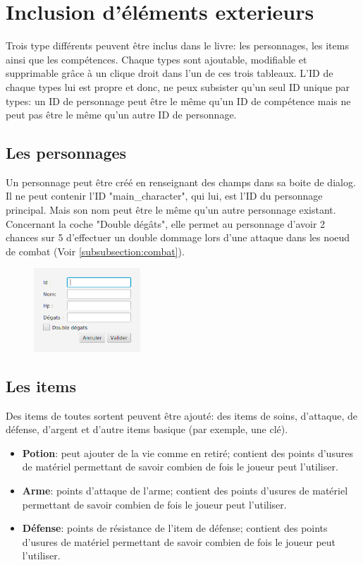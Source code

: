 \chapter{Inclusion d'éléments exterieurs}\label{chapter:inclus}
	Trois type différents peuvent être inclus dans le livre: les personnages, les items ainsi que les compétences. Chaque types sont ajoutable, modifiable et supprimable grâce à un clique droit dans l'un de ces trois tableaux.
	L'ID de chaque types lui est propre et donc, ne peux subsister qu'un seul ID unique par types: un ID de personnage peut être le même qu'un ID de compétence mais ne peut pas être le même qu'un autre ID de personnage.

	\section{Les personnages}
		Un personnage peut être créé en renseignant des champs dans sa boite de dialog. Il ne peut contenir l'ID "main\_character", qui lui, est l'ID du personnage principal. Mais son nom peut être le même qu'un autre personnage existant.
		Concernant la coche "Double dégâts", elle permet au personnage d'avoir 2 chances sur 5 d'effectuer un double dommage lors d'une attaque dans les noeud de combat (Voir \ref{subsubsection:combat}).
	\begin{figure}[H]
		\centering\includegraphics[width=4cm]{img/inclusPersonnages.png}
	\end{figure}

	\section{Les items}
		Des items de toutes sortent peuvent être ajouté: des items de soins, d'attaque, de défense, d'argent et d'autre items basique (par exemple, une clé).
		\begin{itemize}
			\item \textbf{Potion}: peut ajouter de la vie comme en retiré; contient des points d'usures de matériel permettant de savoir combien de fois le joueur peut l'utiliser.
			\item \textbf{Arme}: points d'attaque de l'arme; contient des points d'usures de matériel permettant de savoir combien de fois le joueur peut l'utiliser.
			\item \textbf{Défense}: points de résistance de l'item de défense; contient des points d'usures de matériel permettant de savoir combien de fois le joueur peut l'utiliser.\\
		\end{itemize}

